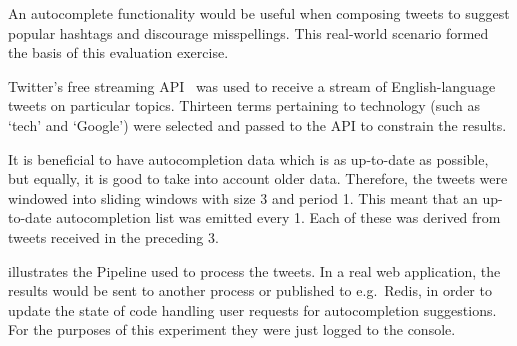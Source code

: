 An autocomplete functionality would be useful when composing tweets to suggest popular hashtags and discourage misspellings.
This real-world scenario formed the basis of this evaluation exercise.

Twitter's free streaming API~\cite{TwitterStreamingAPI} was used to receive a stream of English-language tweets on particular topics.
Thirteen terms pertaining to technology (such as `tech' and `Google') were selected and passed to the API to constrain the results.

It is beneficial to have autocompletion data which is as up-to-date as possible, but equally, it is good to take into account older data.
Therefore, the tweets were windowed into sliding windows with size \SI{3}{\min} and period \SI{1}{\min}.
This meant that an up-to-date autocompletion list was emitted every \SI{1}{\min}.
Each of these was derived from tweets received in the preceding \SI{3}{\min}.

 illustrates the Pipeline used to process the tweets.
In a real web application, the results would be sent to another process or published to e.g.\ Redis, in order to update the state of code handling user requests for autocompletion suggestions.
For the purposes of this experiment they were just logged to the console.

